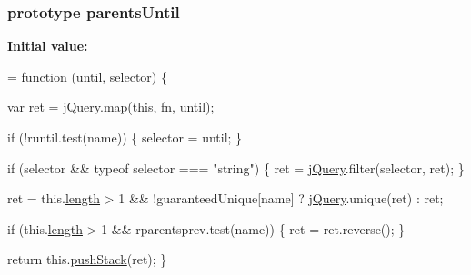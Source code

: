 \subsubsection[{\texorpdfstring{parents\+Until}{parentsUntil}}]{ {\bf prototype} parents\+Until}\hypertarget{jquery-2_82_81-vsdoc_8js_ae2d1b0226f1427006ca38baad3dd6968}{}\label{jquery-2_82_81-vsdoc_8js_ae2d1b0226f1427006ca38baad3dd6968}
{\bfseries Initial value\+:}
\begin{DoxyCode}
= \textcolor{keyword}{function} (until, selector) \{
        

        var ret = \hyperlink{jquery-2_82_81-vsdoc_8js_add5237586d970a38a81f990e8eb28c6c}{jQuery}.map(\textcolor{keyword}{this}, \hyperlink{jquery-2_82_81-vsdoc_8js_acef6bdaf6b9b20fdcca1ea86f0902c3b}{fn}, until);

        \textcolor{keywordflow}{if} (!runtil.test(name)) \{
            selector = until;
        \}

        \textcolor{keywordflow}{if} (selector && typeof selector === \textcolor{stringliteral}{"string"}) \{
            ret = \hyperlink{jquery-2_82_81-vsdoc_8js_add5237586d970a38a81f990e8eb28c6c}{jQuery}.filter(selector, ret);
        \}

        ret = this.\hyperlink{jquery-2_82_81-vsdoc_8js_aa7de35d58da66d9944ab9cbe82c19640}{length} > 1 && !guaranteedUnique[name] ? \hyperlink{jquery-2_82_81-vsdoc_8js_add5237586d970a38a81f990e8eb28c6c}{jQuery}.unique(ret) : ret;

        \textcolor{keywordflow}{if} (this.\hyperlink{jquery-2_82_81-vsdoc_8js_aa7de35d58da66d9944ab9cbe82c19640}{length} > 1 && rparentsprev.test(name)) \{
            ret = ret.reverse();
        \}

        \textcolor{keywordflow}{return} this.\hyperlink{jquery-2_82_81-vsdoc_8js_afc3a7db1ef2b526338c06c07cecccd44}{pushStack}(ret);
    \}
\end{DoxyCode}
